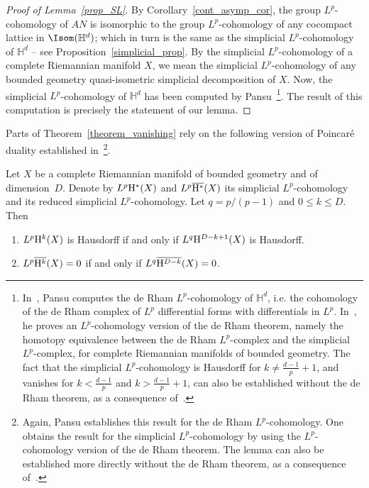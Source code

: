 \begin{proof}[Proof of Lemma~\ref{prop_SL}]
By Corollary~\ref{cont_asymp_cor}, the group $L^p$-cohomology of $AN$ is isomorphic to the group $L^p$-cohomology of any cocompact lattice in $\Isom (\mathbb {H}^d)$; which in turn is the same as the simplicial $L^p$-cohomology of $\mathbb H ^d$ -- see Proposition~\ref{simplicial_prop}. By the simplicial $L^p$-cohomology of a complete Riemannian manifold $X$, we mean the simplicial $L^p$-cohomology of any bounded geometry quasi-isometric simplicial decomposition of $X$. Now, the simplicial $L^p$-cohomology of $\mathbb H ^d$ has been computed by Pansu~\cite{P1,Pa99}\footnote{In~\cite{P1,Pa99}, Pansu computes the de Rham $L^p$-cohomology of $\mathbb H ^d$, i.e. the cohomology of the de Rham complex of $L^p$ differential forms with differentials in $L^p$. In~\cite{Pa95}, he proves an $L^p$-cohomology version of the de Rham theorem, namely the homotopy equivalence between the de Rham $L^p$-complex and the simplicial $L^p$-complex, for complete Riemannian manifolds of bounded geometry. The fact that the simplicial $L^p$-cohomology is Hausdorff for $k\neq \frac{d-1}{p} +1$, and vanishes for $k < \frac{d-1}{p}$ and $k > \frac{d-1}{p}+1$, can also be established without the de Rham theorem, as a consequence of~\cite[Corollary~B]{B16}.}. The result of this computation is precisely the statement of our lemma.
\end{proof}

Parts of Theorem~\ref{theorem_vanishing} rely on the following version of Poincaré duality established in~\cite[Corollaire~14]{P1}\footnote{Again, Pansu establishes this result for the de Rham $L^p$-cohomology. One obtains the result for the simplicial $L^p$-cohomology by using the $L^p$-cohomology version of the de Rham theorem. The lemma can also be established more directly without the de Rham theorem, as a consequence of~\cite[Proposition~1.2 and Theorem~1.3]{B16}.}.


\begin{lemm}\label{lemma_duality}
Let $X$ be a complete Riemannian manifold of bounded geometry and of dimension~$D$.
Denote by $L^p {\rm H}^* (X)$ and $L^p \overline{{\rm H}^*} (X)$ its simplicial $L^p$-cohomology and its reduced simplicial $L^p$-cohomology. Let $q = p/(p-1)$ and $0 \leqslant k \leqslant D$. Then
\begin{enumerate}
\item \label{list6.3.1}$L^p {\rm H}^k (X)$ is Hausdorff if and only if $L^q {\rm H}^{D-k +1} (X)$ is Hausdorff.
\item \label{list6.3.2}$L^p \overline{{\rm H}^k} (X) = 0$ if and only if $L^q \overline{{\rm H}^{D-k}} (X) = 0$.
\end{enumerate}
\end{lemm}



